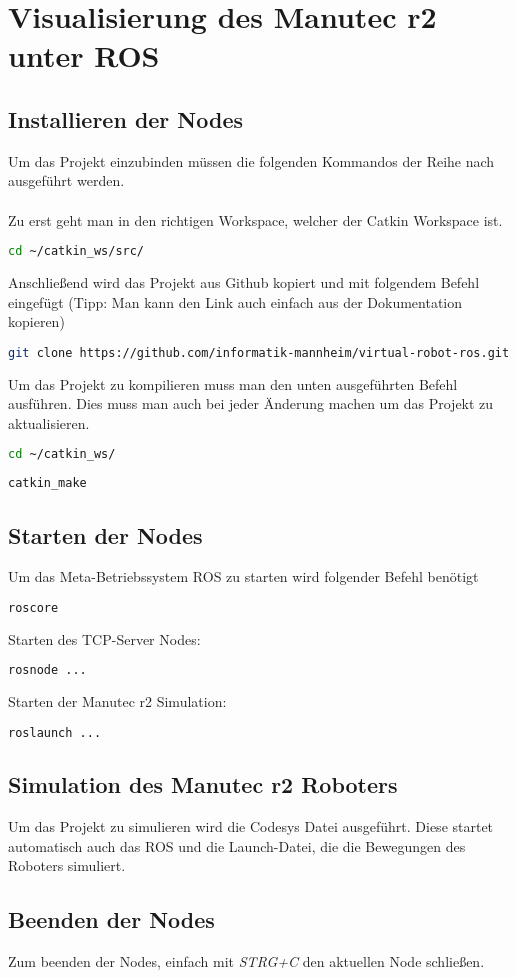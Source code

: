 \section{Visualisierung des Manutec r2 unter ROS}

\subsection{Installieren der Nodes}
Um das Projekt einzubinden müssen die folgenden Kommandos der Reihe nach ausgeführt werden. \\ \\
Zu erst geht man in den richtigen Workspace, welcher der Catkin Workspace ist. 

\begin{lstlisting}[language=bash]
cd ~/catkin_ws/src/
\end{lstlisting}
Anschließend wird das Projekt aus Github kopiert und mit folgendem Befehl eingefügt (Tipp: Man kann den Link auch einfach aus der Dokumentation kopieren)
\begin{lstlisting}[language=bash]
git clone https://github.com/informatik-mannheim/virtual-robot-ros.git
\end{lstlisting}
Um das Projekt zu kompilieren muss man den unten ausgeführten Befehl ausführen. Dies muss man auch bei jeder Änderung machen um das Projekt zu aktualisieren.
\begin{lstlisting}[language=bash]
cd ~/catkin_ws/
\end{lstlisting}

\begin{lstlisting}[language=bash]
catkin_make
\end{lstlisting}

\subsection{Starten der Nodes}
Um das Meta-Betriebssystem ROS zu starten wird folgender Befehl benötigt
\begin{lstlisting}[language=bash]
roscore
\end{lstlisting}
Starten des TCP-Server Nodes:
\begin{lstlisting}[language=bash]
rosnode ...
\end{lstlisting}
Starten der Manutec r2 Simulation:
\begin{lstlisting}[language=bash]
roslaunch ...
\end{lstlisting}



\subsection{Simulation des Manutec r2 Roboters}
Um das Projekt zu simulieren wird die Codesys Datei ausgeführt. Diese startet automatisch auch das ROS und die Launch-Datei, die die Bewegungen des Roboters simuliert. 

\subsection{Beenden der Nodes}
Zum beenden der Nodes, einfach mit \textit{STRG+C} den aktuellen Node schließen.


